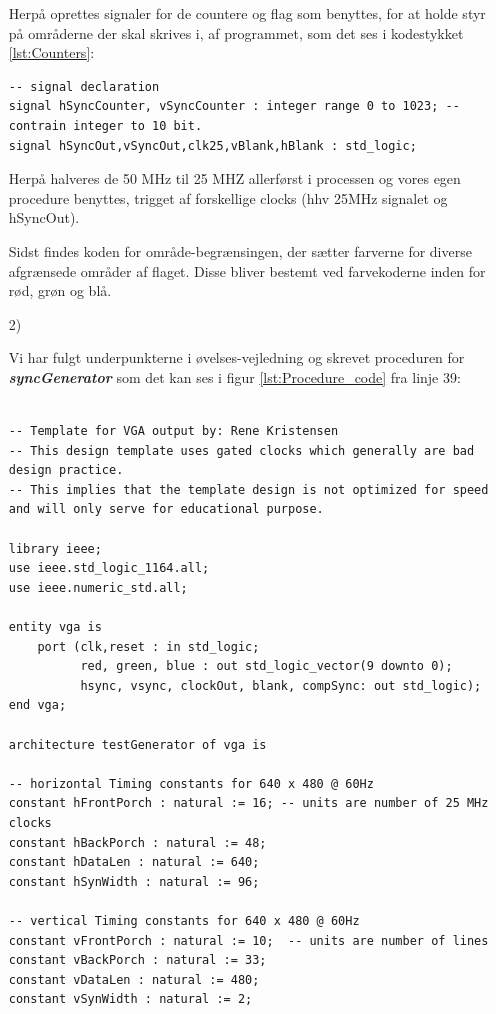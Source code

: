 \begin{enumerate}[1)]
\begin{lstlisting}[caption={Template Boundaries},label={lst:Template_Boundaries}]
	\end{lstlisting}
	
Herpå oprettes signaler for de countere og flag som benyttes, for at holde styr på områderne der skal skrives i, af programmet, som det ses i kodestykket \ref{lst:Counters}:
\begin{lstlisting}[caption={Signal declaration},label={lst:Counters}]
-- signal declaration
signal hSyncCounter, vSyncCounter : integer range 0 to 1023; -- contrain integer to 10 bit.
signal hSyncOut,vSyncOut,clk25,vBlank,hBlank : std_logic;
\end{lstlisting}
	
Herpå halveres de 50 MHz til 25 MHZ allerførst i processen og vores egen procedure benyttes, trigget af forskellige clocks (hhv 25MHz signalet og hSyncOut).

Sidst findes koden for område-begrænsingen, der sætter farverne for diverse afgrænsede områder af flaget. Disse bliver bestemt ved farvekoderne inden for rød, grøn og blå.

\newpage
\item[2)]

Vi har fulgt underpunkterne i øvelses-vejledning og skrevet proceduren for \textit{\textbf{syncGenerator}} som det kan ses i figur \ref{lst:Procedure_code} fra linje 39:
\begin{lstlisting}[caption={syncGenerator Procedure Code},label={lst:Procedure_code}]

-- Template for VGA output by: Rene Kristensen
-- This design template uses gated clocks which generally are bad design practice.
-- This implies that the template design is not optimized for speed and will only serve for educational purpose. 
 
library ieee;
use ieee.std_logic_1164.all;
use ieee.numeric_std.all;

entity vga is
	port (clk,reset : in std_logic;
		  red, green, blue : out std_logic_vector(9 downto 0);
		  hsync, vsync, clockOut, blank, compSync: out std_logic);		
end vga;

architecture testGenerator of vga is

-- horizontal Timing constants for 640 x 480 @ 60Hz
constant hFrontPorch : natural := 16; -- units are number of 25 MHz clocks
constant hBackPorch : natural := 48; 
constant hDataLen : natural := 640;
constant hSynWidth : natural := 96;

-- vertical Timing constants for 640 x 480 @ 60Hz 
constant vFrontPorch : natural := 10;  -- units are number of lines
constant vBackPorch : natural := 33;
constant vDataLen : natural := 480;
constant vSynWidth : natural := 2;


\end{lstlisting}
\end{enumerate}

